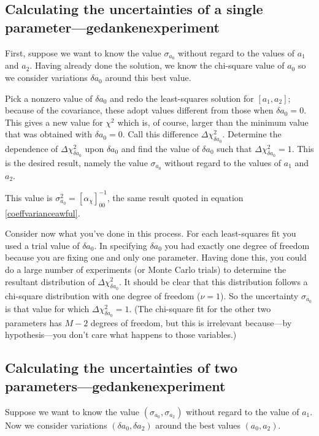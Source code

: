 \documentclass[psfig,preprint]{aastex}
\begin{document}
\subsection{ Calculating the uncertainties of a single 
parameter---gedankenexperiment}
\label{gencalc0} 

	First, suppose we want to know the value $\sigma_{a_0}$ without
regard to the values of $a_1$ and $a_2$.  Having already done the
solution, we know the chi-square value of $a_0$ so we consider
variations $\delta a_0$ around this best value.  

	Pick a nonzero value of $\delta a_0$ and redo the least-squares
solution for $[a_1, a_2]$; because of the covariance, these adopt values
different from those when $\delta a_0 = 0$.  This gives a new value for
$\chi^2$ which is, of course, larger than the minimum value that was
obtained with $\delta a_0=0$.  Call this difference $\Delta \chi_{\delta
a_0}^2$.  Determine the dependence of $\Delta \chi_{\delta a_0}^2$ upon
$\delta a_0$ and find the value of $\delta a_0$ such that $\Delta
\chi_{\delta a_0}^2 = 1$.  This is the desired result, namely the value
$\sigma_{a_0}$ without regard to the values of $a_1$ and $a_2$. 

	This value is $\sigma_{a_0}^2 = [\alpha_\chi]_{00}^{-1}$, the same
result quoted in equation \ref {coeffvarianceawful}.

	Consider now what you've done in this process.  For each
least-squares fit you used a trial value of $\delta a_0$.  In specifying
$\delta a_0$ you had exactly one degree of freedom because you are
fixing one and only one parameter.  Having done this, you could do a
large number of experiments (or Monte Carlo trials) to determine the
resultant distribution of $\Delta \chi_{\delta a_0}^2$.  It should be
clear that this distribution follows a chi-square distribution with one
degree of freedom ($\nu = 1$).  So the uncertainty $\sigma_{a_0}$ is
that value for which $\Delta \chi_{\delta a_0}^2 = 1$.  (The chi-square
fit for the other two parameters has $M-2$ degrees of freedom, but this
is irrelevant because---by hypothesis---you don't care what happens to
those variables.)

\subsection{ Calculating the uncertainties of two
parameters---gedankenexperiment} \label{gencalc1} 

	Suppose we want to know the value $(\sigma_{a_0},\sigma_{a_2})$
without regard to the value of $a_1$.  Now we consider variations
$(\delta a_0, \delta a_2)$ around the best values $(a_0, a_2)$. 
\end{document}
